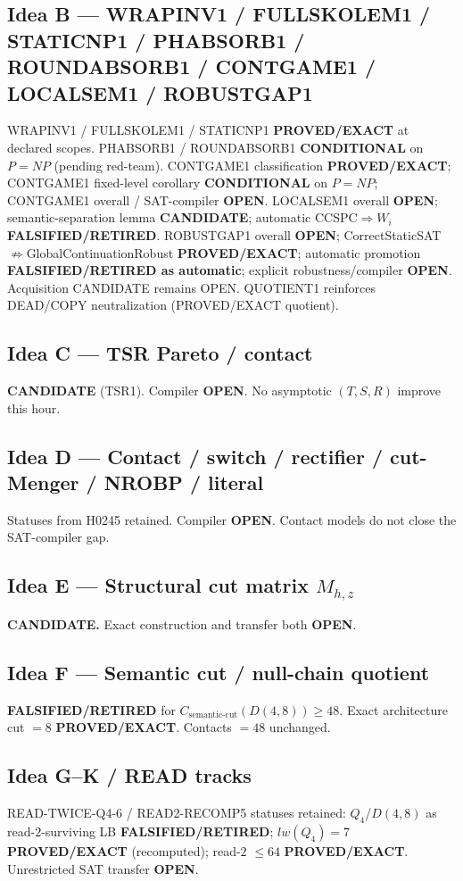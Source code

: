 \documentclass[11pt]{article}
\begin{document}
\subsection*{Idea B --- WRAPINV1 / FULLSKOLEM1 / STATICNP1 / PHABSORB1 / ROUNDABSORB1 / CONTGAME1 / LOCALSEM1 / ROBUSTGAP1}
WRAPINV1 / FULLSKOLEM1 / STATICNP1 \textbf{PROVED/EXACT} at declared scopes.
PHABSORB1 / ROUNDABSORB1 \textbf{CONDITIONAL} on $P=NP$ (pending red-team).
CONTGAME1 classification \textbf{PROVED/EXACT}; CONTGAME1 fixed-level corollary
\textbf{CONDITIONAL} on $P=NP$; CONTGAME1 overall / SAT-compiler \textbf{OPEN}.
LOCALSEM1 overall \textbf{OPEN}; semantic-separation lemma \textbf{CANDIDATE};
automatic CCSPC$\Rightarrow W_i$ \textbf{FALSIFIED/RETIRED}.
ROBUSTGAP1 overall \textbf{OPEN}; CorrectStaticSAT$\not\Rightarrow$GlobalContinuationRobust
\textbf{PROVED/EXACT}; automatic promotion \textbf{FALSIFIED/RETIRED as automatic};
explicit robustness/compiler \textbf{OPEN}.
Acquisition CANDIDATE remains OPEN.
QUOTIENT1 reinforces DEAD/COPY neutralization (PROVED/EXACT quotient).

\subsection*{Idea C --- TSR Pareto / contact}
\textbf{CANDIDATE} (TSR1). Compiler \textbf{OPEN}. No asymptotic $(T,S,R)$ improve this hour.

\subsection*{Idea D --- Contact / switch / rectifier / cut-Menger / NROBP / literal}
Statuses from H0245 retained. Compiler \textbf{OPEN}. Contact models do not close the SAT-compiler gap.

\subsection*{Idea E --- Structural cut matrix $M_{h,z}$}
\textbf{CANDIDATE.} Exact construction and transfer both \textbf{OPEN}.

\subsection*{Idea F --- Semantic cut / null-chain quotient}
\textbf{FALSIFIED/RETIRED} for $C_{\mathrm{semantic\textrm{-}cut}}(D(4,8))\ge48$.
Exact architecture cut $=8$ \textbf{PROVED/EXACT}. Contacts $=48$ unchanged.

\subsection*{Idea G--K / READ tracks}
READ-TWICE-Q4-6 / READ2-RECOMP5 statuses retained: $Q_4$/$D(4,8)$ as read-$2$-surviving LB
\textbf{FALSIFIED/RETIRED}; $lw(Q_4)=7$ \textbf{PROVED/EXACT} (recomputed); read-$2$ $\le64$
\textbf{PROVED/EXACT}. Unrestricted SAT transfer \textbf{OPEN}.
\end{document}

